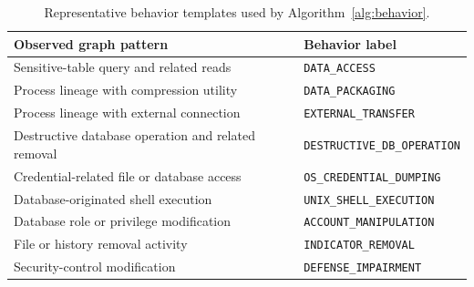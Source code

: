 \documentclass[conference]{IEEEtran}
\begin{document}
\begin{table}[t]
\centering
\caption{Representative behavior templates used by Algorithm~\ref{alg:behavior}.}
\label{tab:behaviors}
\small
\begin{tabular}{@{}p{4.1cm}p{3.2cm}@{}}
\toprule
\textbf{Observed graph pattern} & \textbf{Behavior label} \\
\midrule
Sensitive-table query and related reads &
\texttt{DATA\_ACCESS} \\

Process lineage with compression utility &
\texttt{DATA\_PACKAGING} \\

Process lineage with external connection &
\texttt{EXTERNAL\_TRANSFER} \\

Destructive database operation and related removal &
\texttt{DESTRUCTIVE\_DB\_OPERATION} \\

Credential-related file or database access &
\texttt{OS\_CREDENTIAL\_DUMPING} \\

Database-originated shell execution &
\texttt{UNIX\_SHELL\_EXECUTION} \\

Database role or privilege modification &
\texttt{ACCOUNT\_MANIPULATION} \\

File or history removal activity &
\texttt{INDICATOR\_REMOVAL} \\

Security-control modification &
\texttt{DEFENSE\_IMPAIRMENT} \\
\bottomrule
\end{tabular}
\end{table}
\end{document}

